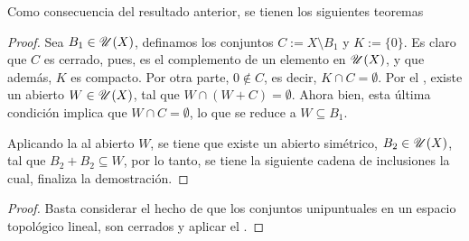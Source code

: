 Como consecuencia del resultado anterior, se tienen los siguientes teoremas
\begin{proof}
Sea $B_1\in\mathscr{U}(X)$, definamos los conjuntos 
$C:=X\setminus B_1$ y $K:=\{0\}$. Es claro que $C$ es
cerrado, pues, es el complemento de un elemento en $\mathscr{U}(X)$,
y que además, $K$ es compacto. Por otra parte, 
$0\notin C$, es decir, $K\cap C=\emptyset$. Por el 
, existe un abierto $W\in\mathscr{U}(X)$, tal que
$W \cap (W+C)=\emptyset$. Ahora bien, esta última condición
implica que $W\cap C=\emptyset$, lo que se reduce a
$W\subseteq B_1$.

Aplicando la  al abierto $W$, se tiene que existe
un abierto simétrico, $B_2\in\mathscr{U}(X)$, tal que
$B_2+B_2\subseteq W$, por lo tanto, se tiene la siguiente
cadena de inclusiones
la cual, finaliza la demostración.
\end{proof}
\begin{proof}
Basta considerar el hecho de que los conjuntos unipuntuales
en un espacio topológico lineal, son cerrados y aplicar
el .
\end{proof}
